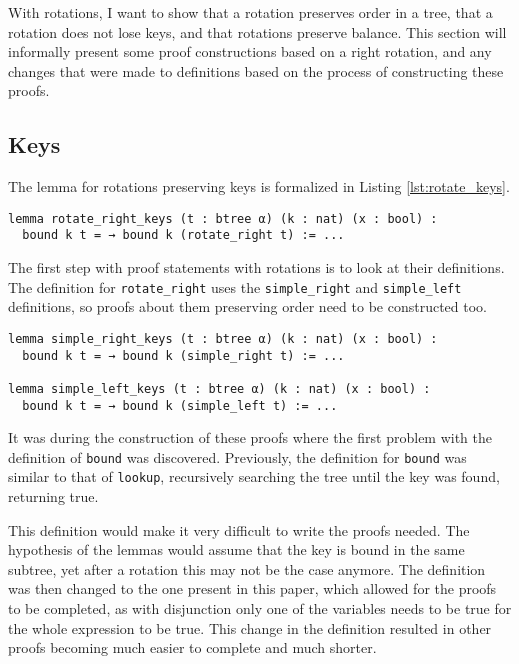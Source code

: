With rotations, I want to show that a rotation preserves order in a tree, that a rotation does not lose keys, and that rotations preserve balance. This section will informally present some proof constructions based on a right rotation, and any changes that were made to definitions based on the process of constructing these proofs.

\subsection*{Keys}
The lemma for rotations preserving keys is formalized in Listing \ref{lst:rotate_keys}.

\begin{lstlisting}[caption=\empty, label={lst:rotate_keys}]
lemma rotate_right_keys (t : btree α) (k : nat) (x : bool) :
  bound k t = → bound k (rotate_right t) := ...
\end{lstlisting}

The first step with proof statements with rotations is to look at their definitions. The definition for \lstinline{rotate_right} uses the \lstinline{simple_right} and \lstinline{simple_left} definitions, so proofs about them preserving order need to be constructed too.

\begin{lstlisting}[caption=\empty]
lemma simple_right_keys (t : btree α) (k : nat) (x : bool) :
  bound k t = → bound k (simple_right t) := ...
  
lemma simple_left_keys (t : btree α) (k : nat) (x : bool) :
  bound k t = → bound k (simple_left t) := ...
\end{lstlisting}

It was during the construction of these proofs where the first problem with the definition of \lstinline{bound} was discovered. Previously, the definition for \lstinline{bound} was similar to that of \lstinline{lookup}, recursively searching the tree until the key was found, returning true.

This definition would make it very difficult to write the proofs needed. The hypothesis of the lemmas would assume that the key is bound in the same subtree, yet after a rotation this may not be the case anymore. The definition was then changed to the one present in this paper, which allowed for the proofs to be completed, as with disjunction only one of the variables needs to be true for the whole expression  to be true. This change in the definition resulted in other proofs becoming much easier to complete and much shorter. 

